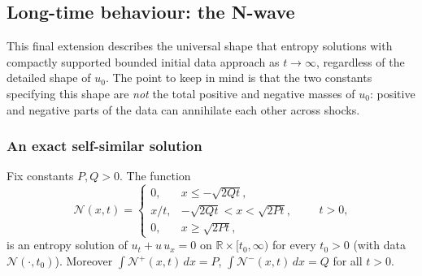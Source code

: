 
\subsection{Long-time behaviour: the N-wave}
\label{subsec:n-wave}

This final extension describes the universal shape that entropy
solutions with compactly supported bounded initial data approach as $t \to
\infty$, regardless of the detailed shape of $u_0$. The point to keep in
mind is that the two constants specifying this shape are \emph{not} the
total positive and negative masses of $u_0$: positive and negative parts
of the data can annihilate each other across shocks.

\subsubsection{An exact self-similar solution}
\label{subsubsec:n-wave-exact}

\begin{proposition}
\label{prop:n-wave-exact}
Fix constants $P, Q > 0$. The function
\begin{equation}
  \label{eq:n-wave}
  \mathcal{N}(x,t) = \begin{cases}
    0, & x \le -\sqrt{2Qt}, \\
    x/t, & -\sqrt{2Qt} < x < \sqrt{2Pt}, \\
    0, & x \ge \sqrt{2Pt},
  \end{cases}
  \qquad t>0,
\end{equation}
is an entropy solution of $u_t+u\,u_x=0$ on $\mathbb{R}\times[t_0,\infty)$
for every $t_0>0$ (with data $\mathcal{N}(\cdot,t_0)$). Moreover
$\int \mathcal{N}^+(x,t)\,dx=P$, $\int \mathcal{N}^-(x,t)\,dx=Q$ for all $t>0$.
\end{proposition}

